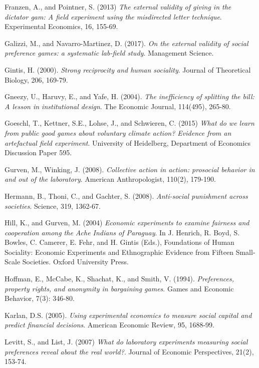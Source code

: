\documentclass{article}
\begin{document}
{\begin{thebibliography}{9}
Franzen, A., and Pointner, S. (2013)
\textit{The external validity of giving in the dictator gam: A field experiment using the misdirected letter technique}.
Experimental Economics, 16, 155-69.

Galizzi, M., and Navarro-Martinez, D. (2017).
\textit{On the external validity of social preference games: a systematic lab-field study}.
Management Science.

Gintis, H. (2000).
\textit{Strong reciprocity and human sociality}.
Journal of Theoretical Biology, 206, 169-79.

Gneezy, U., Haruvy, E., and Yafe, H. (2004).
\textit{The inefficiency of splitting the bill: A lesson in institutional design}.
The Economic Journal, 114(495), 265-80.

Goeschl, T., Kettner, S.E., Lohse, J., and Schwieren, C. (2015)
\textit{What do we learn from public good games about voluntary climate action? Evidence from an artefactual field experiment}.
University of Heidelberg, Department of Economics Discussion Paper 595.

Gurven, M., Winking, J. (2008).
\textit{Collective action in action: prosocial behavior in and out of the laboratory}.
American Anthropologist, 110(2), 179-190. 

Hermann, B., Thoni, C., and Gachter, S. (2008).
\textit{Anti-social punishment across societies}.
Science, 319, 1362-67.

Hill, K., and Gurven, M. (2004)
\textit{Economic experiments to examine fairness and cooperation among the Ache Indians of Paraguay}.
In J. Henrich, R. Boyd, S. Bowles, C. Camerer, E. Fehr, and H. Gintis (Eds.),
Foundations of Human Sociality: Economic Experiments and Ethnographic Evidence from Fifteen Small-Scale Societies. Oxford University Press.

Hoffman, E., McCabe, K., Shachat, K., and Smith, V. (1994).
\textit{Preferences, property rights, and anonymity in bargaining games}.
Games and Economic Behavior, 7(3): 346-80.

Karlan, D.S. (2005).
\textit{Using experimental economics to measure social capital and predict financial decisions}.
American Economic Review, 95, 1688-99.

Levitt, S., and List, J. (2007)
\textit{What do laboratory experiments measuring social preferences reveal about the real world?}.
Journal of Economic Perspectives, 21(2), 153-74.



\end{thebibliography}}
\end{document}
